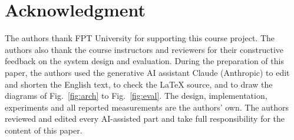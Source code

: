 \documentclass[journal,onecolumn]{IEEEtran}
\begin{document}
\section*{Acknowledgment}

The authors thank FPT University for supporting this course project. The authors also thank the course instructors and
reviewers for their constructive feedback on the system design and evaluation. During the preparation of this paper,
the authors used the generative AI assistant Claude (Anthropic) to edit and shorten the English text, to check the
\LaTeX{} source, and to draw the diagrams of Fig.~\ref{fig:arch} to Fig.~\ref{fig:eval}. The design, implementation,
experiments and all reported measurements are the authors' own. The authors reviewed and edited every AI-assisted part
and take full responsibility for the content of this paper.
\end{document}
